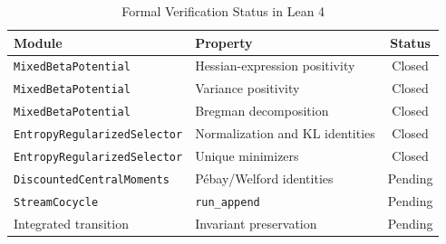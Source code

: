 \begin{table}[h]
\centering
\begin{tabular}{llc}
\toprule
\textbf{Module} & \textbf{Property} & \textbf{Status} \\
\midrule
\texttt{MixedBetaPotential} & Hessian-expression positivity & Closed \\
\texttt{MixedBetaPotential} & Variance positivity & Closed \\
\texttt{MixedBetaPotential} & Bregman decomposition & Closed \\
\texttt{EntropyRegularizedSelector} & Normalization and KL identities & Closed \\
\texttt{EntropyRegularizedSelector} & Unique minimizers & Closed \\
\texttt{DiscountedCentralMoments} & Pébay/Welford identities & Pending \\
\texttt{StreamCocycle} & \texttt{run\_append} & Pending \\
Integrated transition & Invariant preservation & Pending \\
\bottomrule
\end{tabular}
\caption{Formal Verification Status in Lean 4}
\label{tab:theorem_status}
\end{table}
